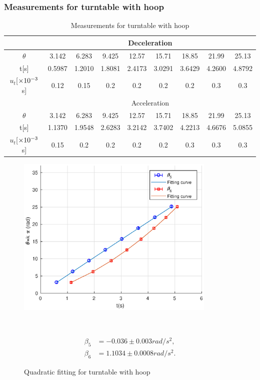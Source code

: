 \subsubsection{Measurements for turntable with hoop}
    \begin{table}[H] \small
        \centering
        \begin{tabular}{|c|c|c|c|c|c|c|c|c|}
            \hline
            & \multicolumn{8}{c|}{Deceleration} \\\hline
            $\theta$ & 3.142 & 6.283 & 9.425 & 12.57 & 15.71 & 18.85 & 21.99 & 25.13\\\hline
            t[s] & 0.5987 & 1.2010 & 1.8081 & 2.4173 & 3.0291 & 3.6429 & 4.2600 & 4.8792\\\hline
            $u_t$[$\times10^{-3}$s] & 0.12 & 0.15 & 0.2 & 0.2 & 0.2 & 0.2 & 0.3 & 0.3\\\hline
            & \multicolumn{8}{c|}{Acceleration} \\\hline
            $\theta$ & 3.142 & 6.283 & 9.425 & 12.57 & 15.71 & 18.85 & 21.99 & 25.13\\\hline
            t[s] & 1.1370 & 1.9548 & 2.6283 & 3.2142 & 3.7402 & 4.2213 & 4.6676 & 5.0855\\\hline
            $u_t$[$\times10^{-3}$s] & 0.15 & 0.2 & 0.2 & 0.2 & 0.2 & 0.3 & 0.3 & 0.3\\\hline
        \end{tabular}
        \caption{Measurements for turntable with hoop}\label{data_3}
    \end{table}

    \begin{figure}[H]
    \centering
    \begin{minipage}{0.6\textwidth}    
        \includegraphics[width=0.85\textwidth]{images/3}
        \caption{Quadratic fitting for turntable with hoop}\label{fig_3}
    \end{minipage}
    ~
    \begin{minipage}{0.35\textwidth}
        \[
        \begin{split}
            \beta_5&=-0.036\pm 0.003rad/s^2,\\
            \beta_6&=1.1034\pm 0.0008rad/s^2.
        \end{split}
        \]
    \end{minipage}
    \end{figure}

